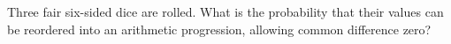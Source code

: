 Three fair six-sided dice are rolled. What is the probability that their values can be reordered into an arithmetic progression, allowing common difference zero?
